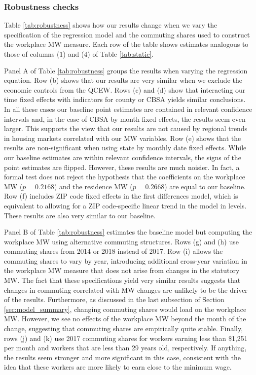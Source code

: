 \subsubsection{Robustness checks}

Table \ref{tab:robustness} shows how our results change when we vary the
specification of the regression model and the commuting shares used 
to construct the workplace MW measure.
Each row of the table shows estimates analogous to those of columns (1) and (4)
of Table \ref{tab:static}.

Panel A of Table \ref{tab:robustness} groups the results when varying the 
regression equation.
Row (b) shows that our results are very similar when we exclude the 
economic controls from the QCEW.
Rows (c) and (d) show that interacting our time fixed effects with indicators 
for county or CBSA yields similar conclusions.
In all these cases our baseline point estimates are contained in relevant 
confidence intervals and, in the case of CBSA by month fixed effects, 
the results seem even larger.
This supports the view that our results are not caused by regional trends 
in housing markets correlated with our MW variables.
Row (e) shows that the results are non-significant when using state by 
monthly date fixed effects.
While our baseline estimates are within relevant confidence intervals, the 
signs of the point estimates are flipped.
However, these results are much noisier.
In fact, a formal test does not reject the hypothesis that the coefficients
on the workplace MW ($p=0.2168$) and the residence MW ($p=0.2668$) are 
equal to our baseline.
Row (f) includes ZIP code fixed effects in the first differences model, which
is equivalent to allowing for a ZIP code-specific linear trend in the model in 
levels.
These results are also very similar to our baseline.

Panel B of Table \ref{tab:robustness} estimates the baseline model but 
computing the workplace MW using alternative commuting structures.
Rows (g) and (h) use commuting shares from 2014 or 2018 instead of 2017.
Row (i) allows the commuting shares to vary by year, introducing additional
cross-year variation in the workplace MW measure that does not arise from 
changes in the statutory MW.
The fact that these specifications yield very similar results suggests that 
changes in commuting correlated with MW changes are unlikely to be the driver
of the results.
Furthermore, as discussed in the last subsection of Section \ref{sec:model_summary},
changing commuting shares would load on the workplace MW.
However, we see no effects of the workplace MW beyond the month of the 
change, suggesting that commuting shares are empirically quite stable.
Finally, rows (j) and (k) use 2017 commuting shares for workers earning 
less than \$1,251 per month and workers that are less than 29 years old, 
respectively.
If anything, the results seem stronger and more significant in this case, 
consistent with the idea that these workers are more likely to earn close to the 
minimum wage.

